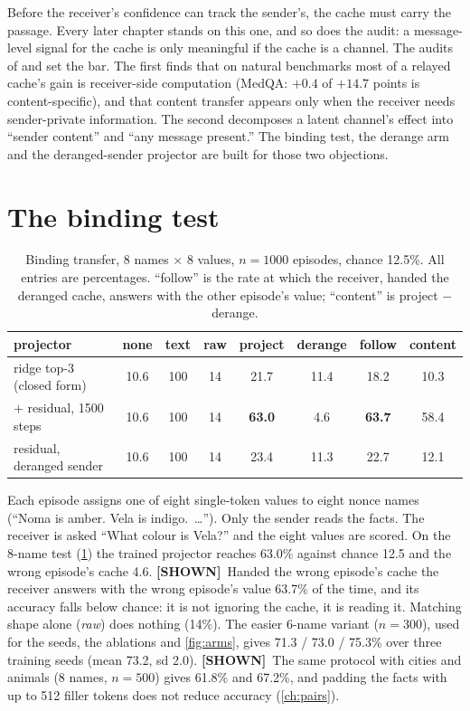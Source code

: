\documentclass[11pt,a4paper]{report}
\newcommand{\SHOWN}{\textcolor{shownc}{\textbf{\scriptsize[SHOWN]}}}
\begin{document}
Before the receiver's confidence can track the sender's, the cache must carry the passage. Every later chapter stands on this one, and so does the audit: a message-level signal for the cache is only meaningful if the cache is a channel. The audits of \citet{2608.04893} and \citet{2607.26773} set the bar. The first finds that on natural benchmarks most of a relayed cache's gain is receiver-side computation (MedQA: $+0.4$ of $+14.7$ points is content-specific), and that content transfer appears only when the receiver needs sender-private information. The second decomposes a latent channel's effect into ``sender content'' and ``any message present.'' The binding test, the derange arm and the deranged-sender projector are built for those two objections.

\section{The binding test}

\begin{table}[h]
\caption{Binding transfer, 8 names $\times$ 8 values, $n = 1000$ episodes, chance 12.5\%. All entries are percentages. ``follow'' is the rate at which the receiver, handed the deranged cache, answers with the other episode's value; ``content'' is project $-$ derange.}
\label{tab:main}
\vskip 0.1in
\begin{center}
\begin{small}
\begin{tabular}{lccccccc}
\toprule
projector & none & text & raw & project & derange & follow & content \\
\midrule
ridge top-3 (closed form)          & 10.6 & 100 & 14 & 21.7 & 11.4 & 18.2 & 10.3 \\
$+$ residual, 1500 steps           & 10.6 & 100 & 14 & \textbf{63.0} & 4.6 & \textbf{63.7} & 58.4 \\
residual, deranged sender          & 10.6 & 100 & 14 & 23.4 & 11.3 & 22.7 & 12.1 \\
\bottomrule
\end{tabular}
\end{small}
\end{center}
\vskip -0.1in
\end{table}

Each episode assigns one of eight single-token values to eight nonce names (``Noma is amber. Vela is indigo.\ \ldots''). Only the sender reads the facts. The receiver is asked ``What colour is Vela?'' and the eight values are scored. On the 8-name test (\cref{tab:main}) the trained projector reaches 63.0\% against chance 12.5 and the wrong episode's cache 4.6. \SHOWN\ Handed the wrong episode's cache the receiver answers with the wrong episode's value 63.7\% of the time, and its accuracy falls below chance: it is not ignoring the cache, it is reading it. Matching shape alone (\emph{raw}) does nothing (14\%). The easier 6-name variant ($n = 300$), used for the seeds, the ablations and \cref{fig:arms}, gives 71.3 / 73.0 / 75.3\% over three training seeds (mean 73.2, sd 2.0). \SHOWN\ The same protocol with cities and animals (8 names, $n = 500$) gives 61.8\% and 67.2\%, and padding the facts with up to 512 filler tokens does not reduce accuracy (\cref{ch:pairs}).
\end{document}
